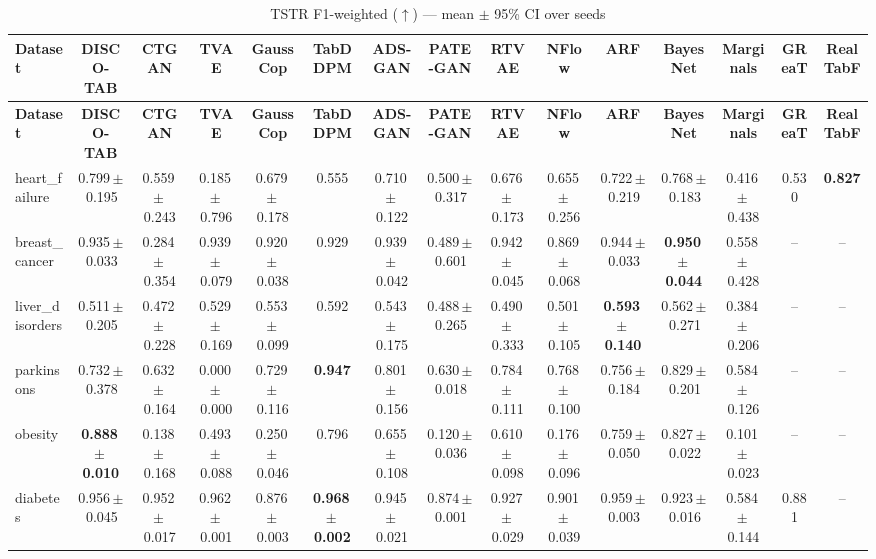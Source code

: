 \documentclass[8pt]{extarticle}
\begin{document}
\begin{longtable}{l*{14}{c}}
\caption{TSTR F1-weighted ($\uparrow$) --- mean $\pm$ 95\% CI over seeds}\\
\toprule
\textbf{Dataset} & \textbf{DISCO-TAB} & \textbf{CTGAN} & \textbf{TVAE} & \textbf{GaussCop} & \textbf{TabDDPM} & \textbf{ADS-GAN} & \textbf{PATE-GAN} & \textbf{RTVAE} & \textbf{NFlow} & \textbf{ARF} & \textbf{BayesNet} & \textbf{Marginals} & \textbf{GReaT} & \textbf{RealTabF} \\
\midrule
\endfirsthead
\toprule
\textbf{Dataset} & \textbf{DISCO-TAB} & \textbf{CTGAN} & \textbf{TVAE} & \textbf{GaussCop} & \textbf{TabDDPM} & \textbf{ADS-GAN} & \textbf{PATE-GAN} & \textbf{RTVAE} & \textbf{NFlow} & \textbf{ARF} & \textbf{BayesNet} & \textbf{Marginals} & \textbf{GReaT} & \textbf{RealTabF} \\
\midrule
\endhead
\bottomrule
\endfoot
heart\_failure & 0.799\,$\pm$\,0.195 & 0.559\,$\pm$\,0.243 & 0.185\,$\pm$\,0.796 & 0.679\,$\pm$\,0.178 & 0.555 & 0.710\,$\pm$\,0.122 & 0.500\,$\pm$\,0.317 & 0.676\,$\pm$\,0.173 & 0.655\,$\pm$\,0.256 & 0.722\,$\pm$\,0.219 & 0.768\,$\pm$\,0.183 & 0.416\,$\pm$\,0.438 & 0.530 & \textbf{0.827} \\
breast\_cancer & 0.935\,$\pm$\,0.033 & 0.284\,$\pm$\,0.354 & 0.939\,$\pm$\,0.079 & 0.920\,$\pm$\,0.038 & 0.929 & 0.939\,$\pm$\,0.042 & 0.489\,$\pm$\,0.601 & 0.942\,$\pm$\,0.045 & 0.869\,$\pm$\,0.068 & 0.944\,$\pm$\,0.033 & \textbf{0.950\,$\pm$\,0.044} & 0.558\,$\pm$\,0.428 & -- & -- \\
liver\_disorders & 0.511\,$\pm$\,0.205 & 0.472\,$\pm$\,0.228 & 0.529\,$\pm$\,0.169 & 0.553\,$\pm$\,0.099 & 0.592 & 0.543\,$\pm$\,0.175 & 0.488\,$\pm$\,0.265 & 0.490\,$\pm$\,0.333 & 0.501\,$\pm$\,0.105 & \textbf{0.593\,$\pm$\,0.140} & 0.562\,$\pm$\,0.271 & 0.384\,$\pm$\,0.206 & -- & -- \\
parkinsons & 0.732\,$\pm$\,0.378 & 0.632\,$\pm$\,0.164 & 0.000\,$\pm$\,0.000 & 0.729\,$\pm$\,0.116 & \textbf{0.947} & 0.801\,$\pm$\,0.156 & 0.630\,$\pm$\,0.018 & 0.784\,$\pm$\,0.111 & 0.768\,$\pm$\,0.100 & 0.756\,$\pm$\,0.184 & 0.829\,$\pm$\,0.201 & 0.584\,$\pm$\,0.126 & -- & -- \\
obesity & \textbf{0.888\,$\pm$\,0.010} & 0.138\,$\pm$\,0.168 & 0.493\,$\pm$\,0.088 & 0.250\,$\pm$\,0.046 & 0.796 & 0.655\,$\pm$\,0.108 & 0.120\,$\pm$\,0.036 & 0.610\,$\pm$\,0.098 & 0.176\,$\pm$\,0.096 & 0.759\,$\pm$\,0.050 & 0.827\,$\pm$\,0.022 & 0.101\,$\pm$\,0.023 & -- & -- \\
diabetes & 0.956\,$\pm$\,0.045 & 0.952\,$\pm$\,0.017 & 0.962\,$\pm$\,0.001 & 0.876\,$\pm$\,0.003 & \textbf{0.968\,$\pm$\,0.002} & 0.945\,$\pm$\,0.021 & 0.874\,$\pm$\,0.001 & 0.927\,$\pm$\,0.029 & 0.901\,$\pm$\,0.039 & 0.959\,$\pm$\,0.003 & 0.923\,$\pm$\,0.016 & 0.584\,$\pm$\,0.144 & 0.881 & -- \\

\end{longtable}
\end{document}
